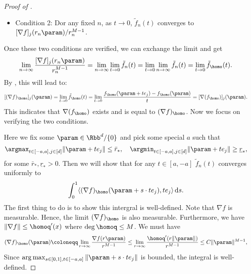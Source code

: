 \begin{proof}[Proof of ]
\begin{itemize}
    \item Condition 2: Dor any fixed $n$, as $t \to 0$, $\tilde f_n(t)$ converges to $[\nabla f]_j (r_n \param) / r_n^{M-1}$. 
\end{itemize}
Once these two conditions are verified, we can exchange the limit and get
\[
\lim_{n\to \infty} \frac{[\nabla f]_j (r_n \param)}{r_n^{M-1}} =\lim_{n\to \infty} \lim_{t\to 0} \tilde f_n(t) = \lim_{t\to 0} \lim_{n\to \infty}  \tilde f_n(t) = \lim_{t\to 0} \tilde f_{\homo} (t). 
\]
By , this will lead to: 
\[
[(\nabla f)_\homo ]_j (\param) = \lim_{t\to 0} \tilde f_{\homo} (t) = \lim_{t\to 0} \frac{f_\homo(\param + t e_j) - f_\homo(\param)}{t} = [\nabla (f_\homo)]_j (\param). 
\]
This indicates that $\nabla (f_\homo)$ exists and is equal to $(\nabla f)_\homo$. Now we focus on verifying the two conditions.

Here we fix some $\param \in \Rbb^d / \{0\}$ and pick some special $a$ such that 
\[
\argmax_{t \in [-a,a], j \in [d]} \| \param + t e_j \| \le \bar{r}_*, \quad \argmin_{t \in [-a,a], j \in [d]} \| \param + t e_j \| \ge \underline{r}_*,
\]
for some $\bar{r}_*,\underline{r}_* > 0$. Then we will show that for any $t\in[a, -a]$ $\tilde f_n(t)$ converges uniformly to 
\[
\int_0^1  \langle (\nabla f)_\homo (\param + s \cdot t e_j), t e_j  \rangle\, \mathrm{d}s. 
\] 
The first thing to do is to show this intergral is well-defined. 
Note that $\nabla f$ is measurable. Hence, the limit $(\nabla f)_\homo$ is also measurable. Furthermore, we have $\|\nabla f \| \le \homoq'(x)$ where $\deg \homoq \le M$. We must have 
\[
    (\nabla f)_\homo (\param) \coloneqq \lim_{r\to \infty} \frac{\nabla f(r\param)}{r^{M-1}} \le \lim_{r\to \infty} \frac{\homoq'(r\|\param\|)}{r^{M-1}} \le C \|\param\|^{M-1},
\]
Since $\arg \max_{s \in [0,1],t\in[-a, a]} \|\param + s \cdot t e_j\|$ is bounded, the integral is well-defined.


\end{proof}
